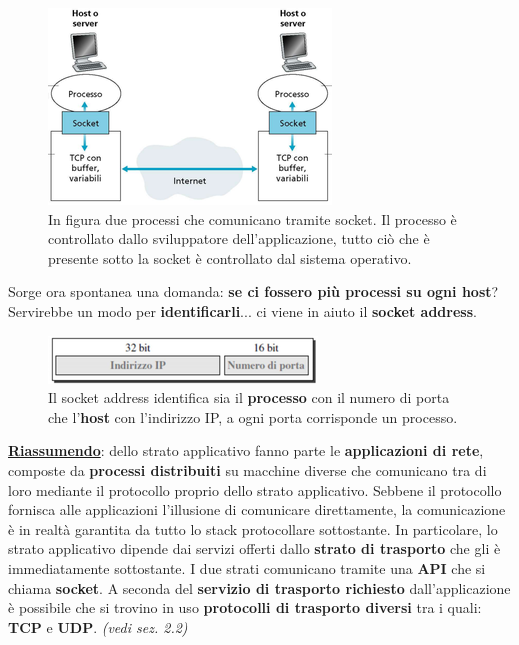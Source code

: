 \documentclass[11pt,a4paper]{article}
\theoremstyle{definition}
\begin{document}
\begin{figure}[!h]
	\includegraphics[scale=0.5]{Immagini/Socket.png}
	\centering
	\caption{In figura due processi che comunicano tramite socket. Il processo è controllato dallo sviluppatore dell'applicazione, tutto ciò che è presente sotto la socket è controllato dal sistema operativo.}
\end{figure}
Sorge ora spontanea una domanda: \textbf{se ci fossero più processi su ogni host}?\newline
Servirebbe un modo per \textbf{identificarli}... ci viene in aiuto il \textbf{socket address}.
\begin{figure}[!h]
	\includegraphics[scale=0.5]{Immagini/Socket_addr.png}
	\centering
	\caption{Il socket address identifica sia il \textbf{processo} con il numero di porta che l'\textbf{host} con l'indirizzo IP, a ogni porta corrisponde un processo.}
\end{figure}
\newpage
\textbf{\underline{Riassumendo}}: dello strato applicativo fanno parte le \textbf{applicazioni di rete}, composte da \textbf{processi distribuiti} su macchine diverse che comunicano tra di loro mediante il protocollo proprio dello strato applicativo. Sebbene il protocollo fornisca alle applicazioni l'illusione di comunicare direttamente, la comunicazione è in realtà garantita da tutto lo stack protocollare sottostante. In particolare, lo strato applicativo dipende dai servizi offerti dallo \textbf{strato di trasporto} che gli è immediatamente sottostante. I due strati comunicano tramite una \textbf{API} che si chiama \textbf{socket}.\newline\newline
A seconda del \textbf{servizio di trasporto richiesto} dall'applicazione è possibile che si trovino in uso \textbf{protocolli di trasporto diversi} tra i quali: \textbf{TCP} e \textbf{UDP}. \textit{(vedi sez. 2.2)}
\end{document}
